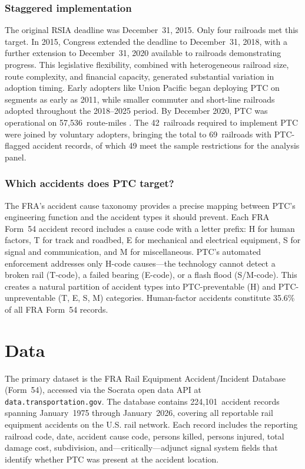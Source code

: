 \documentclass[12pt]{article}
\begin{document}
\subsubsection*{Staggered implementation} The original RSIA deadline was December~31, 2015. Only four railroads met this target. In 2015, Congress extended the deadline to December~31, 2018, with a further extension to December~31, 2020 available to railroads demonstrating progress. This legislative flexibility, combined with heterogeneous railroad size, route complexity, and financial capacity, generated substantial variation in adoption timing. Early adopters like Union Pacific began deploying PTC on segments as early as 2011, while smaller commuter and short-line railroads adopted throughout the 2018--2025 period. By December 2020, PTC was operational on 57,536~route-miles \citep{FRA2021Status}. The 42~railroads required to implement PTC were joined by voluntary adopters, bringing the total to 69~railroads with PTC-flagged accident records, of which 49 meet the sample restrictions for the analysis panel.

\subsubsection*{Which accidents does PTC target?} The FRA's accident cause taxonomy provides a precise mapping between PTC's engineering function and the accident types it should prevent. Each FRA Form~54 accident record includes a cause code with a letter prefix: H for human factors, T for track and roadbed, E for mechanical and electrical equipment, S for signal and communication, and M for miscellaneous. PTC's automated enforcement addresses only H-code causes---the technology cannot detect a broken rail (T-code), a failed bearing (E-code), or a flash flood (S/M-code). This creates a natural partition of accident types into PTC-preventable (H) and PTC-unpreventable (T, E, S, M) categories. Human-factor accidents constitute 35.6\% of all FRA Form~54 records.


\section{Data}
\label{sec:data}

The primary dataset is the FRA Rail Equipment Accident/Incident Database (Form~54), accessed via the Socrata open data API at \texttt{data.transportation.gov}. The database contains 224,101~accident records spanning January~1975 through January~2026, covering all reportable rail equipment accidents on the U.S. rail network. Each record includes the reporting railroad code, date, accident cause code, persons killed, persons injured, total damage cost, subdivision, and---critically---adjunct signal system fields that identify whether PTC was present at the accident location.
\end{document}
